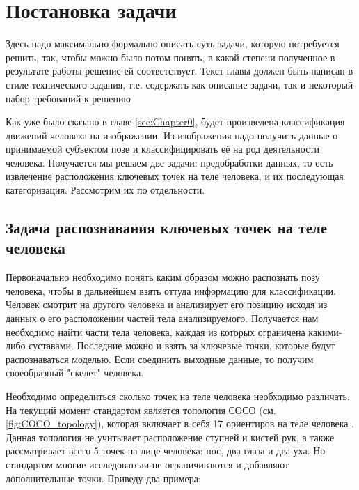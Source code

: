 \section{Постановка задачи}
\label{sec:Chapter1} 
Здесь надо максимально формально описать суть задачи, которую потребуется решить, так, чтобы можно было потом понять, в какой степени полученное в результате работы решение ей соответствует. Текст главы должен быть написан в стиле технического задания, т.е. содержать как описание задачи, так и некоторый набор требований к решению

Как уже было сказано в главе \ref{sec:Chapter0}, будет произведена классификация движений человека на изображении. Из изображения надо получить данные о принимаемой субъектом позе и классифицировать её на род деятельности человека. Получается мы решаем две задачи: предобработки данных, то есть извлечение расположения ключевых точек на теле человека, и их последующая категоризация. Рассмотрим их по отдельности.


\subsection{Задача распознавания ключевых точек на теле человека}
\label{subsec:Theory of keypoint detection}

Первоначально необходимо понять каким образом можно распознать позу человека, чтобы в дальнейшем взять оттуда информацию для классификации. Человек смотрит на другого человека и анализирует его позицию исходя из данных о его расположении частей тела анализируемого. Получается нам необходимо найти части тела человека, каждая из которых ограничена какими-либо суставами. Последние можно и взять за ключевые точки, которые будут распознаваться моделью. Если соединить выходные данные, то получим своеобразный "скелет"{} человека.

Необходимо определиться сколько точек на теле человека необходимо различать. На текущий момент стандартом является топология СОСО (см. \autoref{fig:COCO_topology}), которая включает в себя 17 ориентиров на теле человека \cite{COCO_topology, COCO_dataset}. Данная топология не учитывает расположение ступней и кистей рук, а также рассматривает всего 5 точек на лице человека: нос, два глаза и два уха. Но стандартом многие исследователи не ограничиваются и добавляют дополнительные точки. Приведу два примера:

